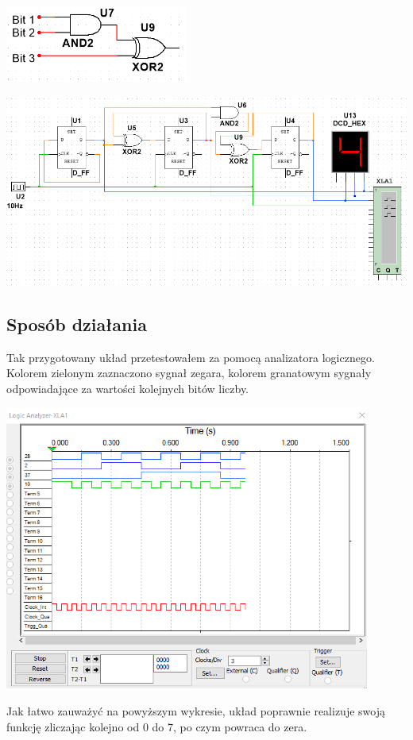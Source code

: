 \documentclass{article}
\begin{document}
            \begin{center}
                \includegraphics[width=6cm]{reports/img/Z3C_3.png}\\
            \end{center}
            \begin{center}
                \includegraphics[width=18cm]{reports/img/Z3C_1.png}\\
            \end{center}

            \FloatBarrier
        
        \subsection{Sposób działania}
            Tak przygotowany układ przetestowałem za pomocą analizatora logicznego. Kolorem zielonym zaznaczono sygnał zegara, kolorem granatowym sygnały odpowiadające za wartości kolejnych bitów liczby. 
            \begin{center}
                \includegraphics[width=12cm]{reports/img/Z3C_2.png}\\
            \end{center}
            Jak łatwo zauważyć na powyższym wykresie, układ poprawnie realizuje swoją funkcję zliczając kolejno od 0 do 7, po czym powraca do zera. 
        
\end{document}
